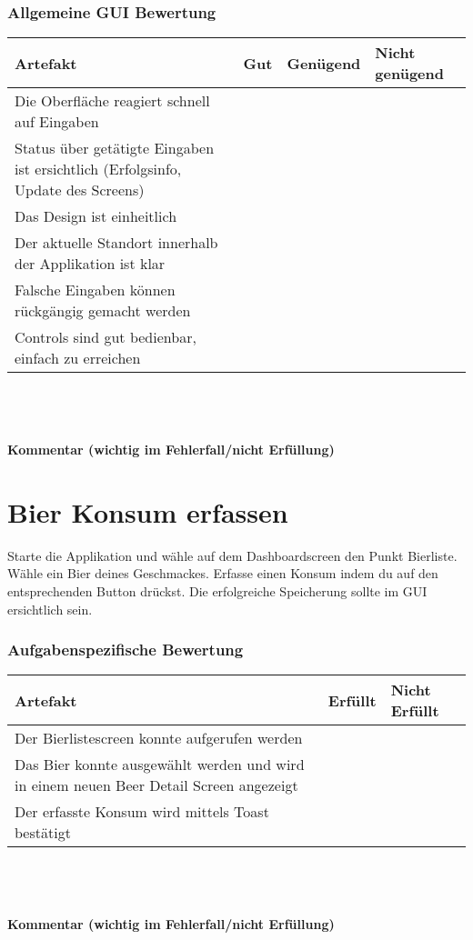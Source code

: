 \documentclass[10pt,a4paper]{scrartcl}
\begin{document}
\subsubsection*{Allgemeine GUI Bewertung}
\begin{tabular}{|p{}|p{}|p{}|p{}|}
\hline 
\rule[-1ex]{0pt}{2.5ex} \textbf{Artefakt} & \textbf{Gut} & \textbf{Genügend} & \textbf{Nicht genügend} \\ 
\hline 
\rule[-1ex]{0pt}{2.5ex} Die Oberfläche reagiert schnell auf Eingaben &  &  &  \\ 
\hline 
\rule[-1ex]{0pt}{2.5ex} Status über getätigte Eingaben ist ersichtlich (Erfolgsinfo, Update des Screens) &  &  &  \\ 
\hline 
\rule[-1ex]{0pt}{2.5ex} Das Design ist einheitlich &  &  &  \\ 
\hline 
\rule[-1ex]{0pt}{2.5ex} Der aktuelle Standort innerhalb der Applikation ist klar &  &  &  \\ 
\hline 
\rule[-1ex]{0pt}{2.5ex} Falsche Eingaben können rückgängig gemacht werden &  &  &  \\ 
\hline 
\rule[-1ex]{0pt}{2.5ex} Controls sind gut bedienbar, einfach zu erreichen &  &  &  \\  
\hline 
\end{tabular} 
\\
\\
\\
\textbf{Kommentar (wichtig im Fehlerfall/nicht Erfüllung)}
\vspace*{3cm}

\section{Bier Konsum erfassen}
Starte die Applikation und wähle auf dem Dashboardscreen den Punkt Bierliste. Wähle ein Bier deines Geschmackes. Erfasse einen Konsum indem du auf den entsprechenden Button drückst. Die erfolgreiche Speicherung sollte im GUI ersichtlich sein.

\subsubsection*{Aufgabenspezifische Bewertung}
\begin{tabular}{|p{}|p{}|p{}|}
\hline 
\textbf{Artefakt} & \textbf{Erfüllt} & \textbf{Nicht Erfüllt} \\ 
\hline 
Der Bierlistescreen konnte aufgerufen werden &  &  \\ 
\hline 
Das Bier konnte ausgewählt werden und wird in einem neuen Beer Detail Screen angezeigt &  &  \\ 
\hline 
Der erfasste Konsum wird mittels Toast bestätigt &  &  \\ 
\hline 
\end{tabular}
\\
\\
\\
\textbf{Kommentar (wichtig im Fehlerfall/nicht Erfüllung)}
\vspace*{3cm}
\end{document}

